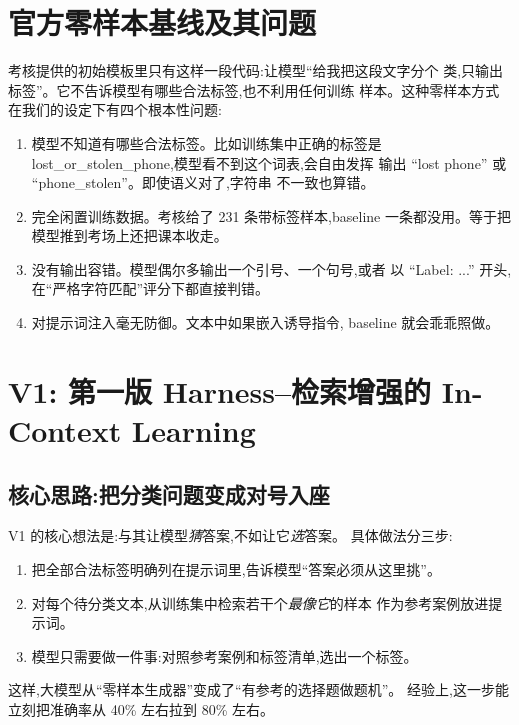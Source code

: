 \documentclass[10pt,twocolumn,letterpaper]{article}
\begin{document}
\section{官方零样本基线及其问题}
\label{sec:baseline}

考核提供的初始模板里只有这样一段代码:让模型``给我把这段文字分个
类,只输出标签''。它不告诉模型有哪些合法标签,也不利用任何训练
样本。这种零样本方式在我们的设定下有四个根本性问题:
\begin{enumerate}[leftmargin=*,itemsep=2pt,topsep=2pt]
\item 模型不知道有哪些合法标签。比如训练集中正确的标签是
  lost\_or\_stolen\_phone,模型看不到这个词表,会自由发挥
  输出 ``lost phone'' 或 ``phone\_stolen''。即使语义对了,字符串
  不一致也算错。
\item 完全闲置训练数据。考核给了 231 条带标签样本,baseline
  一条都没用。等于把模型推到考场上还把课本收走。
\item 没有输出容错。模型偶尔多输出一个引号、一个句号,或者
  以 ``Label: ...'' 开头,在``严格字符匹配''评分下都直接判错。
\item 对提示词注入毫无防御。文本中如果嵌入诱导指令,
  baseline 就会乖乖照做。
\end{enumerate}

\section{V1: 第一版 Harness--检索增强的 In-Context Learning}
\label{sec:v1}

\subsection{核心思路:把分类问题变成对号入座}
V1 的核心想法是:与其让模型\emph{猜}答案,不如让它\emph{选}答案。
具体做法分三步:
\begin{enumerate}[leftmargin=*,itemsep=2pt,topsep=2pt]
\item 把全部合法标签明确列在提示词里,告诉模型``答案必须从这里挑''。
\item 对每个待分类文本,从训练集中检索若干个\emph{最像它}的样本
  作为参考案例放进提示词。
\item 模型只需要做一件事:对照参考案例和标签清单,选出一个标签。
\end{enumerate}
这样,大模型从``零样本生成器''变成了``有参考的选择题做题机''。
经验上,这一步能立刻把准确率从 40\% 左右拉到 80\% 左右。
\end{document}
